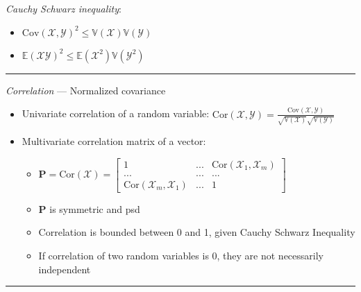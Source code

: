 \emph{Cauchy Schwarz inequality}: \begin{itemize}
    \item $\textrm{Cov}(\mathcal{X},\mathcal{Y})^2 \leq \mathbb{V}(\mathcal{X})\mathbb{V}(\mathcal{Y})$
    \item $\mathbb{E}(\mathcal{X}\mathcal{Y})^2 \leq \mathbb{E}(\mathcal{X}^2)\mathbb{V}(\mathcal{Y}^2)$
\end{itemize}

{\color{lightgray}\hrule height 0.001mm}

\emph{Correlation} --- Normalized covariance
\begin{itemize}
    \item Univariate correlation of a random variable: $\textrm{Cor}(\mathcal{X}, \mathcal{Y}) = \frac{\textrm{Cov}(\mathcal{X}, \mathcal{Y})}{\sqrt{\mathbb{V}(\mathcal{X})} \sqrt{\mathbb{V}(\mathcal{Y})}}$ 
    \item Multivariate correlation matrix of a vector: 
    \begin{itemize}
        \item $\boldsymbol{P} = \textrm{Cor}(\boldsymbol{\mathcal{X}}) = \begin{bmatrix}
        1 & ... & \textrm{Cor}(\mathcal{X}_1,\mathcal{X}_m) \\
        ... & ... & ... \\
        \textrm{Cor}(\mathcal{X}_m,\mathcal{X}_1) & ... & 1
        \end{bmatrix}$
        \item $\boldsymbol{P}$ is symmetric and psd
        \item Correlation is bounded between 0 and 1, given Cauchy Schwarz Inequality
        \item If correlation of two random variables is 0, they are not necessarily independent
    \end{itemize}
\end{itemize}

{\color{black}\hrule height 0.001mm}

